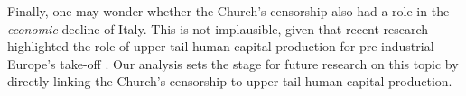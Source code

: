 Finally, one may wonder whether the Church's censorship also had a role in the \textit{economic} decline of Italy. This is not implausible, given that recent research highlighted the role of upper-tail human capital production for pre-industrial Europe's take-off \cite{squicciarini2015,cantoni2014,mokyr2012,mokyr2016}. Our analysis sets the stage for future research on this topic by directly linking the Church's censorship to upper-tail human capital production.



